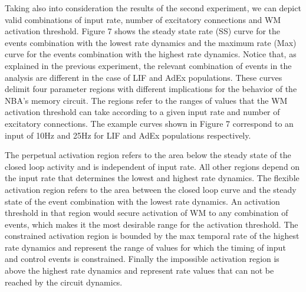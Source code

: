 \documentclass[10pt]{article}
\begin{document}
Taking also into consideration the results of the second experiment, we can depict valid combinations of input rate, number of excitatory connections and WM activation threshold.
Figure 7 shows the steady state rate (SS) curve for the events combination with the lowest rate dynamics and the maximum rate (Max) curve for the events combination with the highest rate dynamics.
Notice that, as explained in the previous experiment, the relevant combination of events in the analysis are different in the case of LIF and AdEx populations.
These curves delimit four parameter regions with different implications for the behavior of the NBA's memory circuit.
The regions refer to the ranges of values that the WM activation threshold can take according to a given input rate and number of excitatory connections.
The example curves shown in Figure 7 correspond to an input of 10Hz and 25Hz for LIF and AdEx populations respectively.

The perpetual activation region refers to the area below the steady state of the closed loop activity and is independent of input rate.
All other regions depend on the input rate that determines the lowest and highest rate dynamics.
The flexible activation region refers to the area between the closed loop curve and the steady state of the event combination with the lowest rate dynamics.
An activation threshold in that region would secure activation of WM to any combination of events, which makes it the most desirable range for the activation threshold.
The constrained activation region is bounded by the max temporal rate of the highest rate dynamics and represent the range of values for which the timing of input and control events is constrained.
Finally the impossible activation region is above the highest rate dynamics and represent rate values that can not be reached by the circuit dynamics.
\end{document}
